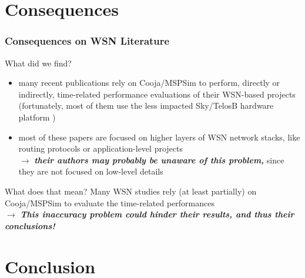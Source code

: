 \documentclass[10pt,c]{beamer}
\renewcommand{\emph}[1]{\textbf{\textit{#1}}}
\begin{document}

\section{Consequences}

\begin{frame}
\vspace{-0.25cm}
\frametitle{Consequences on WSN Literature}
\begin{block}{What did we find?}
\begin{itemize}
\item many recent publications rely on Cooja/MSPSim to perform, directly
or indirectly, time-related performance evaluations of their WSN-based
projects (fortunately, most of them use the less impacted Sky/TelosB
hardware platform
\cite{Constrain-Routing-Trees-2014} \cite{Co-RPL-2014} \cite{DINAS-2014}
\cite{Efficient-Distrib-Svc-Discovery-2014} \cite{IETF-Routing-WSN-2014}
\cite{TinySDN-2014} \cite{Trickle-L2-2014}
\cite{Visual-Sensor-Networks-2014})
\item most of these papers are focused on higher layers of WSN network
stacks, like routing protocols 
\cite{Constrain-Routing-Trees-2014} \cite{Co-RPL-2014}
\cite{IETF-Routing-WSN-2014} \cite{Trickle-L2-2014}
or application-level projects
\cite{DINAS-2014} \cite{Efficient-Distrib-Svc-Discovery-2014}
\cite{Visual-Sensor-Networks-2014} \cite{Key-Mgmt-2015} \\
$\rightarrow$ \emph{their authors may probably be unaware of this problem,}
since they are not focused on low-level details
\end{itemize}
\end{block}
\vspace{-0.25cm}
\begin{alertblock}{What does that mean?}
Many WSN studies rely (at least partially) on Cooja/MSPSim to evaluate
the time-related performances \\
$\rightarrow$ \emph{This inaccuracy problem could hinder their results,
and thus their conclusions!}
\end{alertblock}
\end{frame}


\section{Conclusion}
\end{document}
